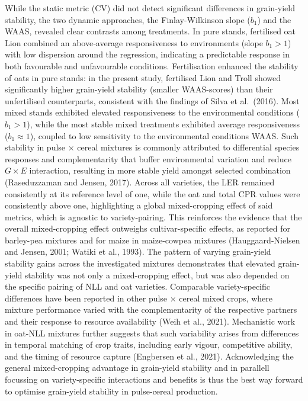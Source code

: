\documentclass[
  british,
  a4paper,
  DIV=11,
  numbers=noendperiod]{scrreprt}
\begin{document}
While the static metric (CV) did not detect significant differences in
grain‑yield stability, the two dynamic approaches, the Finlay-Wilkinson
slope (\(b_{1}\)) and the WAAS, revealed clear contrasts among
treatments. In pure stands, fertilised oat Lion combined an
above‑average responsiveness to environments (slope \(b_{1} > 1\)) with
low dispersion around the regression, indicating a predictable response
in both favourable and unfavourable conditions. Fertilisation enhanced
the stability of oats in pure stands: in the present study, fertilised
Lion and Troll showed significantly higher grain-yield stability
(smaller WAAS-scores) than their unfertilised counterparts, consistent
with the findings of Silva et al.~(2016). Most mixed stands exhibited
elevated responsiveness to the environmental conditions (\(b_{1} > 1\)),
while the most stable mixed treatments exhibited average responsiveness
(\(b_{1} \approx 1\)), coupled to low sensitivity to the environmental
conditions WAAS. Such stability in pulse × cereal mixtures is commonly
attributed to differential species responses and complementarity that
buffer environmental variation and reduce \(G \times E\) interaction,
resulting in more stable yield amongst selected combination
(Raseduzzaman and Jensen, 2017). Across all varieties, the LER remained
consistently at its reference level of one, while the oat and total CPR
values were consistently above one, highlighting a global mixed-cropping
effect of said metrics, which is agnostic to variety-pairing. This
reinforces the evidence that the overall mixed-cropping effect outweighs
cultivar-specific effects, as reported for barley-pea mixtures and for
maize in maize-cowpea mixtures (Hauggaard-Nielsen and Jensen, 2001;
Watiki et al., 1993). The pattern of varying grain-yield stability gains
across the investigated mixtures demonstrates that elevated grain-yield
stability was not only a mixed-cropping effect, but was also depended on
the specific pairing of NLL and oat varieties. Comparable
variety-specific differences have been reported in other pulse × cereal
mixed crops, where mixture performance varied with the complementarity
of the respective partners and their response to resource availability
(Weih et al., 2021). Mechanistic work in oat-NLL mixtures further
suggests that such variability arises from differences in temporal
matching of crop traits, including early vigour, competitive ability,
and the timing of resource capture (Engbersen et al., 2021).
Acknowledging the general mixed-cropping advantage in grain-yield
stability and in parallell focussing on variety-specific interactions
and benefits is thus the best way forward to optimise grain-yield
stability in pulse-cereal production.
\end{document}
